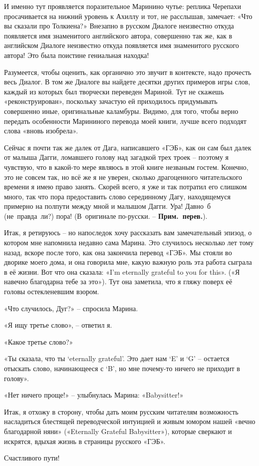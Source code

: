 \documentclass[../main.tex]{subfiles}
\begin{document}
И именно тут проявляется поразительное Маринино чутье: реплика Черепахи просачивается на нижний уровень к Ахиллу и тот, не расслышав, замечает: «Что вы сказали про Толкиена?» Внезапно в русском Диалоге неизвестно откуда появляется имя знаменитого английского автора, совершенно так же, как в английском Диалоге неизвестно откуда появляется имя знаменитого русского автора!
Это была поистине гениальная находка!

Разумеется, чтобы оценить, как органично это звучит в контексте, надо прочесть весь Диалог. В том же Диалоге вы найдете десятки других примеров игры слов, каждый из которых был творчески переведен Мариной. Тут не скажешь «реконструирован», поскольку зачастую ей приходилось придумывать совершенно иные, оригинальные каламбуры. Видимо, для того, чтобы верно передать особенности Марининого перевода моей книги, лучше всего подходят слова «вновь изобрела».

Сейчас я почти так же далек от Дага, написавшего «ГЭБ», как он сам был далек от малыша Дагги, ломавшего голову над загадкой трех троек \--- поэтому я чувствую, что в какой-то мере являюсь в этой книге незваным гостем. Конечно, это не совсем так, но всё же я не уверен, сколько драгоценного читательского времени я имею право занять. Скорей всего, я уже и так потратил его слишком много, так что пора предоставить слово серединному Дагу, находящемуся примерно на полпути между мной и малышом Дагги. Ура! Давно~б (не~правда~ли?) пора! (В~оригинале по-русски. \--- \textbf{Прим.\ перев.}).

Итак, я ретируюсь \--- но напоследок хочу рассказать вам замечательный эпизод, о котором мне напомнила недавно сама Марина. Это случилось несколько лет тому назад, вскоре после того, как она закончила перевод «ГЭБ». Мы стояли во дворике моего дома, и она говорила мне, какую важную роль эта работа сыграла в её жизни. Вот что она сказала: «I'm eternally grateful to you for this». («Я навечно благодарна тебе за это»). Тут она заметила, что я гляжу поверх её головы остекленевшим взором.

«Что случилось, Дуг?» \--- спросила Марина.

«Я ищу третье слово», \--- ответил я.

«Какое третье слово?»

«Ты сказала, что ты \enquote*{eternally grateful}. Это дает нам \enquote*{E} и \enquote*{G} \--- остается отыскать слово, начинающееся с \enquote*{B}, но мне почему-то ничего не приходит в голову».

«Нет ничего проще!» \--- улыбнулась Марина: «Babysitter!»

Итак, я отхожу в сторону, чтобы дать моим русским читателям возможность насладиться блестящей переводческой интуицией и живым юмором нашей «вечно благодарной няни» («Eternally Grateful Babysitter»), которые сверкают и искрятся, вдыхая жизнь в страницы русского «ГЭБ».

\medskip

Счастливого пути!
\end{document}

